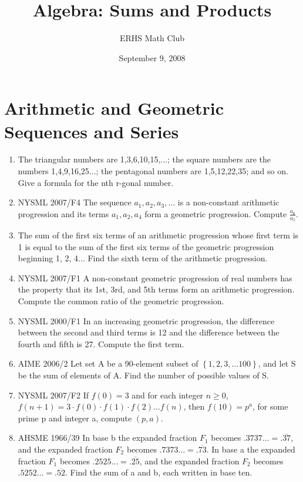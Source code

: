 \documentclass{article}
\title{Algebra: Sums and Products}
\author{ERHS Math Club}
\date{September 9, 2008}
\begin{document}
\maketitle{}

\section{Arithmetic and Geometric Sequences and Series}

\begin{enumerate}
\item The triangular numbers are 1,3,6,10,15,...; the square numbers are the numbers 1,4,9,16,25...; the pentagonal numbers are 1,5,12,22,35; and so on. Give a formula for the nth r-gonal number.
\item NYSML 2007/F4 The sequence $a_1, a_2, a_3, \ldots $ is a non-constant arithmetic progression and its terms $a_1, a_2, a_4$ form a geometric progression. Compute $\frac{a_6}{a_5}$.
\item The sum of the first six terms of an arithmetic progression whose first term is 1 is equal to the sum of the first six terms of the geometric progression beginning 1, 2, 4... Find the sixth term of the arithmetic progression.
\item NYSML 2007/F1 A non-constant geometric progression of real numbers has the property that its 1st, 3rd, and 5th terms form an arithmetic progression. Compute the common ratio of the geometric progression.
\item NYSML 2000/F1 In an increasing geometric progression, the difference between the second and third terms is 12 and the difference between the fourth and fifth is 27. Compute the first term.
\item AIME 2006/2 Let set A be a 90-element subset of $\left\{1,2,3,\ldots 100\right\}$, and let S be the sum of elements of A. Find the number of possible values of S.
\item NYSML 2007/F2 If $f(0) = 3$ and for each integer $n \geq 0$, $f(n+1) = 3 \cdot f(0) \cdot f(1) \cdot f(2) \ldots f(n)$, then $f(10) = p^a$, for some prime p and integer a, compute $(p,a)$.
\item AHSME 1966/39 In base b the expanded fraction $F_1$ becomes $.3737 \ldots = .\overline{37}$, and the expanded fraction $F_2$ becomes $.7373 \ldots = .\overline{73}$. In base a the expanded fraction $F_1$ becomes $.2525 \ldots = .\overline{25}$, and the expanded fraction $F_2$ becomes $.5252 \ldots = .\overline{52}$. Find the sum of a and b, each written in base ten.

\end{enumerate}
\end{document}
